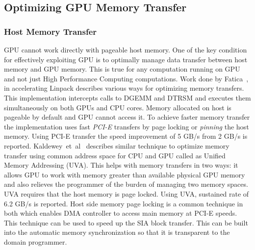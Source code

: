 \subsection{Optimizing GPU Memory Transfer}
\subsubsection{Host Memory Transfer}
GPU cannot work directly with pageable host memory. One of the key condition for
effectively exploiting GPU is to optimally manage data transfer between host memory
and GPU memory. This is true for any computation running on GPU and not just High
Performance Computing computations. Work done by Fatica~\cite{Fatica:2009:ALC:1513895.1513901},
in accelerating Linpack describes various ways for optimizing memory transfers. This
implementation intercepts calls to DGEMM and DTRSM and executes them simultaneously
on both GPUs and CPU cores. Memory allocated on host is pageable by default and GPU
cannot access it. To achieve faster memory transfer the implementation uses fast
\textit{PCI-E} transfers by page locking or \textit{pinning} the host memory. Using
PCI-E transfer the speed improvement of 5 GB/s from 2 GB/s is reported.
Kaldewey~et~al~\cite{Kaldewey:2012:GJP:2236584.2236592} describes similar technique
to optimize memory transfer using common address space for CPU and GPU called as
Unified Memory Addressing (UVA). This helps with memory transfers in two ways: it
allows GPU to work with memory greater than available physical GPU memory and also relieves
the programmer of the burden of managing two memory spaces. UVA requires that the
host memory is page locked. Using UVA, sustained rate of 6.2 GB/s is reported.
Host side memory page locking is a common technique in both which enables DMA controller
to access main memory at PCI-E speeds. This technique can be used to speed up the
SIA block transfer. This can be built into the automatic memory synchronization
so that it is transparent to the domain programmer.

